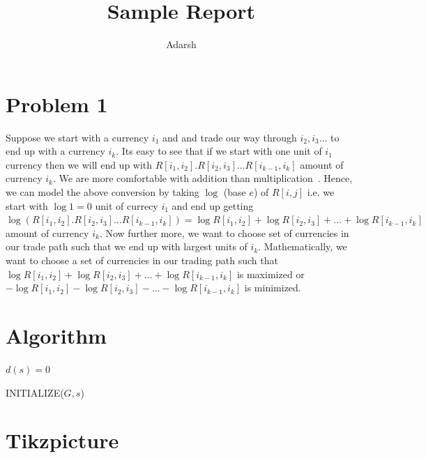 \documentclass[12pt]{article}
\title{Sample Report}
\author{Adarsh}
\date{}
\begin{document}
\maketitle

\pagebreak
\hypersetup{linkcolor=black!40!orange}
\tableofcontents
\pagebreak
\hypersetup{linkcolor=blue!80!green}

\section{Problem 1}
Suppose we start with a currency $i_1$ and and trade our way through $i_2, i_3\dots$ to end up with a currency $i_k$. Its easy to see that if we start with one unit of $i_1$ currency then we will end up with $R[i_1,i_2].R[i_2,i_3]\dots R[i_{k-1},i_k]$ amount of currency $i_k$. We are more comfortable with addition than multiplication~\cite{tawarmalani2009allocating}. Hence, we can model the above conversion by taking $\log$ (base $e$) of $R[i,j]$ i.e. we start with $\log 1 = 0$ unit of currecy $i_1$ and end up getting $\log (R[i_1,i_2].R[i_2,i_3]\dots R[i_{k-1},i_k]) = \log R[i_1,i_2] + \log R[i_2,i_3]+\dots+\log R[i_{k-1},i_k]$ amount of currency $i_k$. Now further more, we want to choose set of currencies in our trade path such that we end up with largest units of $i_k$. Mathematically, we want to choose a set of currencies in our trading path such that $\log R[i_1,i_2] + \log R[i_2,i_3]+\dots+\log R[i_{k-1},i_k]$ is maximized or $ -\log R[i_1,i_2] - \log R[i_2,i_3]-\dots-\log R[i_{k-1},i_k]$ is minimized.


\section{Algorithm}
\begin{algorithm}[H]
	$d(s) = 0$
\caption{INITIALIZE($G,s$)}
\end{algorithm}   

\section{Tikzpicture}
\begin{center}
\end{center}
\end{document}
